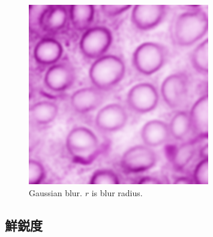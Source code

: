 \begin{figure}[H]
\begin{minipage}{0.24\columnwidth}
	\end{minipage}
	\begin{minipage}{0.24\columnwidth}
		\centering
		\includegraphics[clip, width=\linewidth]{fig/preprocessing/data_aug/color/blur/blur_2_00}
	\end{minipage}
	
	\caption{Gaussian blur. $r$ is blur radius.}
	\label{fig:ガウシアンブラー}
	
\end{figure}

\subsection*{鮮鋭度}

